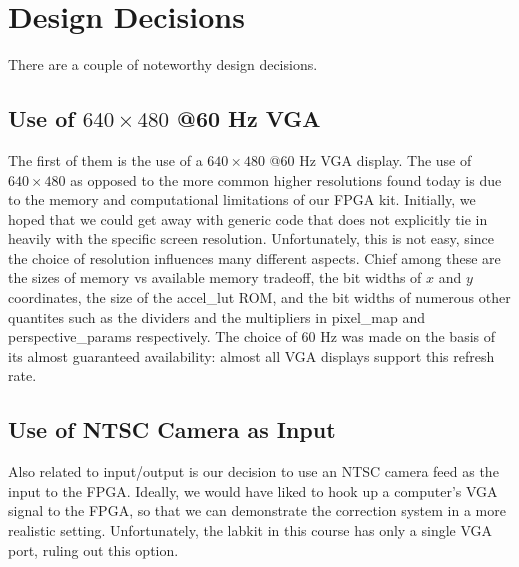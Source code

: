 \documentclass{article}
\begin{document}
\section{Design Decisions}

There are a couple of noteworthy design decisions.

\subsection{Use of $640 \times 480$ @60 Hz VGA}
The first of them is the use of a $640 \times 480$ @60 Hz VGA display.
The use of $640 \times 480$  as opposed to the more common higher resolutions found today is due to the memory and computational limitations of our FPGA kit.
Initially, we hoped that we could get away with generic code that does not explicitly tie in heavily with the specific screen resolution.
Unfortunately, this is not easy, since the choice of resolution influences many different aspects.
Chief among these are the sizes of memory vs available memory tradeoff, the bit widths of $x$ and $y$ coordinates, the size of the accel\_lut ROM,
and the bit widths of numerous other quantites such as the dividers and the multipliers in pixel\_map and perspective\_params respectively.
The choice of 60 Hz was made on the basis of its almost guaranteed availability: almost all VGA displays support this refresh rate.

\subsection{Use of NTSC Camera as Input}
Also related to input/output is our decision to use an NTSC camera feed as the input to the FPGA.
Ideally, we would have liked to hook up a computer's VGA signal to the FPGA, so that we can demonstrate the correction system in a more realistic setting.
Unfortunately, the labkit in this course has only a single VGA port, ruling out this option.
\end{document}
